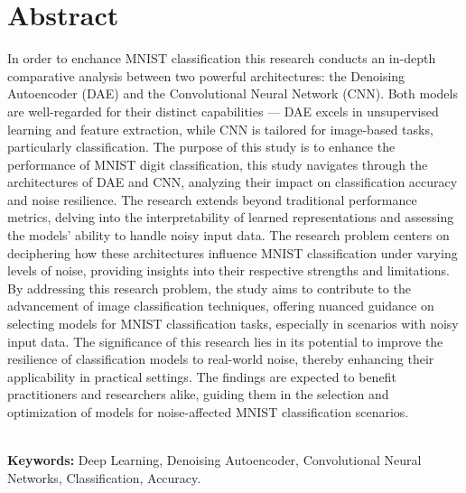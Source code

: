\chapter*{\center \Large  Abstract}

In order to enchance MNIST classification this research conducts an in-depth 
comparative analysis between two powerful architectures: the Denoising Autoencoder (DAE) and 
the Convolutional Neural Network (CNN). Both models are well-regarded for their distinct 
capabilities — DAE excels in unsupervised learning and feature extraction, while CNN is 
tailored for image-based tasks, particularly  classification. The purpose of this study is to enhance the performance of MNIST digit classification, this study navigates through the 
architectures of DAE and CNN, analyzing their impact on classification accuracy and noise 
resilience. The research extends beyond traditional performance metrics, delving into the 
interpretability of learned representations and assessing the models' ability to handle noisy 
input data. The research problem centers on deciphering how these architectures influence MNIST 
classification under varying levels of noise, providing insights into their respective 
strengths and limitations.  By addressing this research problem, the study aims to contribute 
to the advancement of image classification techniques, offering nuanced guidance on selecting 
models for MNIST classification tasks, especially in scenarios with noisy input data. The 
significance of this research lies in its potential to improve the resilience of classification 
models to real-world noise, thereby enhancing their applicability in practical settings. The 
findings are expected to benefit practitioners and researchers alike, guiding them in the 
selection and optimization of models for noise-affected MNIST classification scenarios.


~\\[1cm]
\noindent %
\textbf{Keywords:} Deep Learning, Denoising Autoencoder,
Convolutional Neural Networks, Classification, Accuracy.
